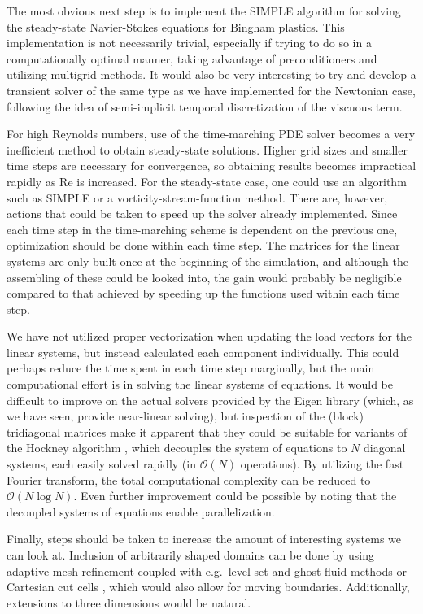 \documentclass[final,3p,twocolumn]{elsarticle}
\begin{document}
The most obvious next step is to implement the SIMPLE algorithm for solving the
steady-state Navier-Stokes equations for Bingham plastics. This implementation
is not necessarily trivial, especially if trying to do so in a computationally
optimal manner, taking advantage of preconditioners and utilizing multigrid
methods. It would also be very interesting to try and develop a transient
solver of the same type as we have implemented for the Newtonian case,
following the idea of semi-implicit temporal discretization of the viscuous
term. 

For high Reynolds numbers, use of the time-marching PDE solver becomes a very
inefficient method to obtain steady-state solutions. Higher grid sizes and
smaller time steps are necessary for convergence, so obtaining results becomes
impractical rapidly as Re is increased. For the steady-state case, one could
use an algorithm such as SIMPLE or a vorticity-stream-function method.  There
are, however, actions that could be taken to speed up the solver already
implemented. Since each time step in the time-marching scheme is dependent on
the previous one, optimization should be done within each time step. The
matrices for the linear systems are only built once at the beginning of the
simulation, and although the assembling of these could be looked into, the gain
would probably be negligible compared to that achieved by speeding up the
functions used within each time step. 

We have not utilized proper vectorization when updating the load vectors for
the linear systems, but instead calculated each component individually. This
could perhaps reduce the time spent in each time step marginally, but the main
computational effort is in solving the linear systems of equations. It would be
difficult to improve on the actual solvers provided by the Eigen
library (which, as we have seen, provide near-linear solving), but inspection
of the (block) tridiagonal matrices make it apparent that they could be
suitable for variants of the Hockney algorithm \cite{hockney1965fast}, which
decouples the system of equations to $N$ diagonal systems, each easily solved
rapidly (in $\mathcal{O}(N)$ operations). By utilizing the fast Fourier
transform, the total computational complexity can be reduced to $\mathcal{O}(N
\log N)$. Even further improvement could be possible by noting that the
decoupled systems of equations enable parallelization. 

Finally, steps should be taken to increase the amount of interesting
systems we can look at. Inclusion of arbitrarily shaped domains can be done by
using adaptive mesh refinement \cite{schoch2013eulerian, lovett2015adaptive}
coupled with e.g.\ level set and ghost fluid methods \cite{schoch2013eulerian}
or Cartesian cut cells \cite{klein2009well}, which would also allow for moving
boundaries.  Additionally, extensions to three dimensions would be natural. 
\end{document}
